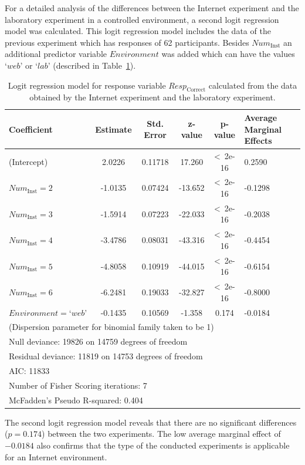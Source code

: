 For a detailed analysis of the differences between the Internet experiment and the laboratory experiment in a controlled environment, a second logit regression model was calculated. This logit regression model includes the data of the previous experiment which has responses of 62 participants. Besides $\textit{Num}_{\mathrm{Inst}}$ an additional predictor variable $\textit{Environment}$ was added which can have the values $\textrm{`}web\textrm{'}$ or $\textrm{`}lab\textrm{'}$ (described in Table~\ref{table:data_both_lm}).
\begin{table}[t]
\center
\scriptsize
\begin{tabular}{p{1.5cm}ccccp{0.8cm}}
\toprule[1.5pt]
Coefficient & Estimate & Std. Error & z-value & p-value & Average Marginal Effects \\
\midrule
(Intercept) & 2.0226 & 0.11718 & 17.260 & \textless~2e-16 & 0.2590\\
$\textit{Num}_{\mathrm{Inst}} = 2$ & -1.0135 & 0.07424 & -13.652  & \textless~2e-16 & -0.1298\\
$\textit{Num}_{\mathrm{Inst}} = 3$ & -1.5914 & 0.07223 & -22.033  & \textless~2e-16 & -0.2038\\
$\textit{Num}_{\mathrm{Inst}} = 4$ & -3.4786 & 0.08031 & -43.316  & \textless~2e-16 & -0.4454\\
$\textit{Num}_{\mathrm{Inst}} = 5$ & -4.8058 & 0.10919 & -44.015  & \textless~2e-16 & -0.6154\\
$\textit{Num}_{\mathrm{Inst}} = 6$ & -6.2481 & 0.19033 & -32.827  & \textless~2e-16 & -0.8000\\
$\textit{Environment} = \textrm{`}web\textrm{'}$ & -0.1435 & 0.10569 & -1.358  & 0.174 & -0.0184\\
\midrule
\multicolumn{6}{l}{(Dispersion parameter for binomial family taken to be 1)}\\
\multicolumn{6}{l}{Null deviance: 19826  on 14759  degrees of freedom}\\
\multicolumn{6}{l}{Residual deviance: 11819  on 14753  degrees of freedom}\\
\multicolumn{6}{l}{AIC: 11833}\\
\multicolumn{6}{l}{Number of Fisher Scoring iterations: 7}\\
\multicolumn{6}{l}{McFadden's Pseudo R-squared: 0.404}\\
\bottomrule[1.5pt]
\end{tabular}
\caption{Logit regression model for response variable $\textit{Resp}_{\mathrm{Correct}}$ calculated from the data obtained by the Internet experiment and the laboratory experiment.}
\label{table:data_both_lm}
\end{table}
The second logit regression model reveals that there are no significant differences ($p = 0.174$) between the two experiments. The low average marginal effect of $-0.0184$ also confirms that the type of the conducted experiments is applicable for an Internet environment.

